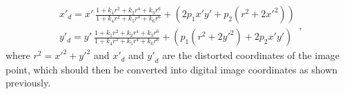 \begin{equation}
\label{cha2:sec2:eq:radiald}
\begin{array} { l } 
{ x' _d = x' \ \frac{ 1 + k_1 r^2 + k_2 r^4 + k_3 r^6}{ 1 + k_4 r^2 + k_5 r^4 + k_6 r^6}  +  ( 2 p_1 x' y' + p_2 ( r^2 + 2 x'^2) )}\\ 
{ y' _d = y' \ \frac{ 1 + k_1 r^2 + k_2 r^4 + k_3 r^6}{ 1 + k_4 r^2 + k_5 r^4 + k_6 r^6} +  ( p_1 ( r^2 + 2 y'^2 ) + 2 p_2 x' y')}
\end{array},
\end{equation}
where $r^{2} = {x'}^{2} + {y'}^{2}$ and ${x'}_d$ and ${y'}_d$ are the distorted coordinates of the image point, which should then be converted into digital image coordinates as shown previously. 
